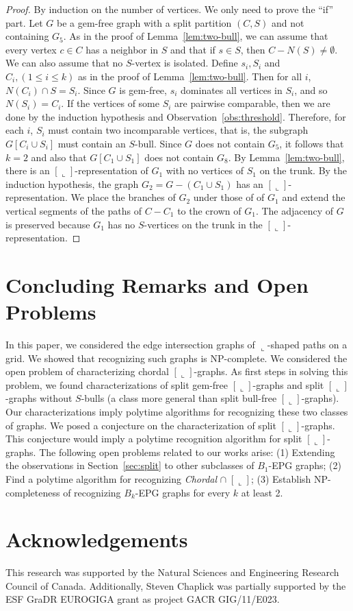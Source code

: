 \documentclass[11pt,3p,times]{elsarticle}
\newenvironment{myproof}{\begin{proof}}{\end{proof}}
\newcommand{\La}{\ensuremath{\llcorner}} \newcommand{\Lb}{\ensuremath{\ulcorner}} \newcommand{\Lc}{\ensuremath{\lrcorner}} \newcommand{\Ld}{\ensuremath{\urcorner}}
\begin{document}
\begin{myproof}
By induction on the number of vertices. We
only need to prove the ``if'' part. Let $G$ be a gem-free graph
with a split partition $(C,S)$ and not containing $G_5$.
As in the proof of Lemma~\ref{lem:two-bull}, we can assume that
every vertex $c \in C$ has a neighbor in $S$ and that if $s \in S$,
then $C-N(S) \neq \emptyset$. We can also assume that no
$S$-vertex is isolated.
Define $s_i, S_i$ and $C_i, (1 \le i \le k)$ as in the proof of Lemma~\ref{lem:two-bull}.
Then for all $i$, $N(C_i) \cap S = S_i$. Since $G$ is gem-free,
$s_i$ dominates all vertices in $S_i$, and so $N(S_i) = C_i$. If
the vertices of some $S_i$ are pairwise comparable, then we are done
by the induction hypothesis and Observation~\ref{obs:threshold}.
Therefore, for each $i$, $S_i$ must contain two incomparable vertices,
that is, the subgraph $G[C_i \cup S_i]$ must contain an $S$-bull.  Since
$G$ does not contain $G_5$, it follows that $k=2$ and also that
$G[C_1 \cup S_1]$ does not contain $G_8$.   By
Lemma~\ref{lem:two-bull}, there is an $[\La]$-representation of
$G_1$ with no vertices of $S_1$ on the trunk. By the induction
hypothesis, the graph $G_2=G-(C_1 \cup S_1)$ has an
$[\La]$-representation. We place the branches of $G_2$ under those
of of $G_1$ and extend the vertical segments of the paths of
$C-C_1$ to the crown of $G_1$. The adjacency of $G$ is preserved
because $G_1$ has no $S$-vertices on the trunk in the
$[\La]$-representation.
\end{myproof}
\section{Concluding Remarks and Open Problems}\label{sec:conclusion}
In this paper, we considered the edge intersection graphs of
$\La$-shaped paths on a grid. We showed that recognizing such
graphs is NP-complete. We considered the open problem of
characterizing chordal $[\La]$-graphs. As first steps in solving
this problem, we found characterizations of split gem-free
$[\La]$-graphs and split $[\La]$-graphs without $S$-bulls (a class
more general than split bull-free $[\La]$-graphs). Our
characterizations imply polytime algorithms for recognizing these
two classes of graphs. We posed a conjecture on the
characterization of split $[\La]$-graphs. This conjecture would
imply a polytime recognition algorithm for split $[\La]$-graphs. The
following open problems related to our works arise: (1) Extending
the observations in Section~\ref{sec:split} to other subclasses of
$B_1$-EPG graphs; (2) Find a polytime algorithm for recognizing {\em Chordal}
$\cap \; [\La]$; (3) Establish NP-completeness of recognizing
$B_k$-EPG graphs for every $k$ at least 2.

\section{Acknowledgements}
This research was supported by the Natural Sciences and Engineering Research Council of Canada. 
Additionally, Steven Chaplick was partially supported by the ESF GraDR EUROGIGA grant as project GACR GIG/11/E023.






\end{document}
